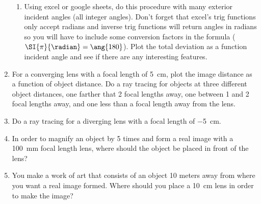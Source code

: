 \begin{enumerate}
\begin{enumerate}
	\item Using excel or google sheets, do this procedure with many exterior incident angles (all integer angles). Don't forget that excel's trig functions only accept radians and inverse trig functions will return angles in radians so you will have to include some conversion factors in the formula ($\SI{\pi}{\radian} = \ang{180}$). Plot the total deviation as a function incident angle and see if there are any interesting features.
	 
\end{enumerate}

\newpage
\item
For a converging lens with a focal length of \SI{+5}{cm}, plot the image distance as a function of object distance. Do a ray tracing for objects at three different object distances, one farther that 2 focal lengths away, one between 1 and 2 focal lengths away, and one less than a focal length away from the lens. 

\newpage
\item
Do a ray tracing for a diverging lens with a focal length of \SI{-5}{cm}. 

\item
In order to magnify an object by 5 times and form a real image with a \SI{100}{mm} focal length lens, where should the object be placed in front of the lens?

\item
You make a work of art that consists of an object 10 meters away from where you want a real image formed. Where should you place a \SI{10}{cm} lens in order to make the image?

\newpage 

\ %

\newpage

\end{enumerate}
